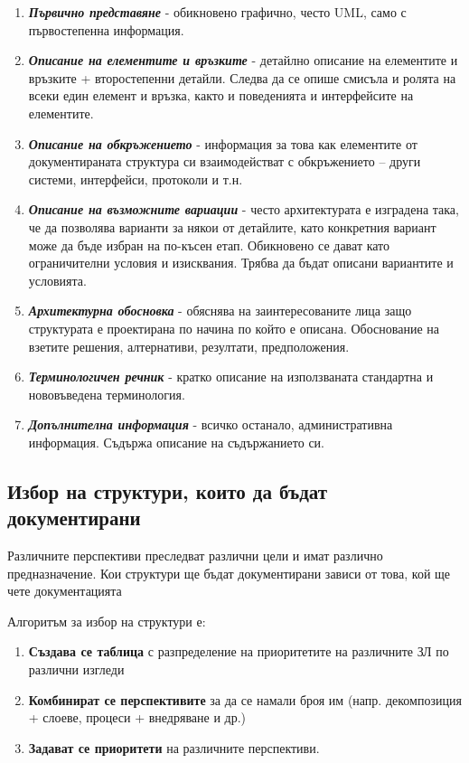 \documentclass[fleqn,12pt]{article}
\begin{document}
\begin{enumerate}
\item \textbf{\textit{Първично представяне}} -  обикновено графично, често UML, само с първостепенна информация.
\item \textbf{\textit{Описание на елементите и връзките}} - детайлно описание на елементите и връзките + второстепенни детайли. Следва да се опише смисъла и ролята на всеки един елемент и връзка, както и поведенията и интерфейсите на елементите.
\item \textbf{\textit{Описание на обкръжението}} - информация за това как елементите от документираната структура си взаимодействат с обкръжението – други системи, интерфейси, протоколи и т.н.
\item \textbf{\textit{Описание на възможните вариации}} - често архитектурата е изградена така, че да позволява варианти за някои от детайлите, като конкретния вариант може да бъде избран на по-късен етап. Обикновено се дават като ограничителни условия и изисквания. Трябва да бъдат описани вариантите и условията.
\item \textbf{\textit{Архитектурна обосновка}} - обяснява на заинтересованите лица защо структурата е проектирана по начина по който е описана. Обоснование на взетите решения, алтернативи, резултати, предположения.
\item \textbf{\textit{Терминологичен речник}} - кратко описание на използваната стандартна и нововъведена терминология.
\item \textbf{\textit{Допълнителна информация}} - всичко останало, административна информация. Съдържа описание на съдържанието си.
\end{enumerate}

\subsection{Избор на структури, които да бъдат документирани}
Различните перспективи преследват различни цели и имат различно предназначение.
Кои структури ще бъдат документирани зависи от това, кой ще чете документацията
\bigbreak

Алгоритъм за избор на структури е:
\begin{enumerate}
    \item \textbf{Създава се таблица} с разпределение на приоритетите на различните ЗЛ по различни изгледи
    \item \textbf{Комбинират се перспективите} за да се намали броя им (напр. декомпозиция + слоеве, процеси + внедряване и др.)
    \item \textbf{Задават се приоритети} на различните перспективи.
\end{enumerate}
\end{document}
